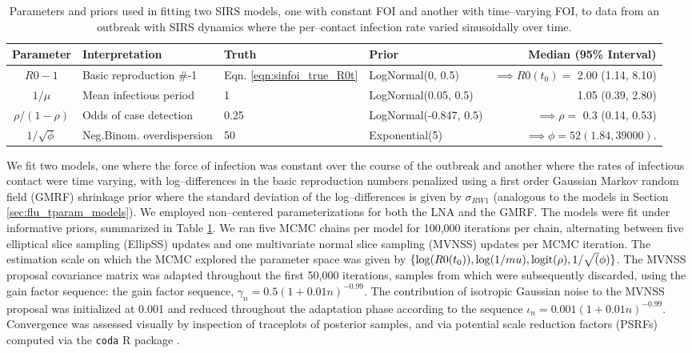 \begin{table}[htbp]
	\caption[Parameters and priors for models fit two SIRS models to data from a simulated outbreak with sinusoidal FOI.]{Parameters and priors used in fitting two SIRS models, one with constant FOI and another with time--varying FOI, to data from an outbreak with SIRS dynamics where the per--contact infection rate varied sinusoidally over time.}
	\label{tab:tparam_sim_priors}
	\scriptsize\centering
	\begin{tabular}{clllr}
		\hline
		\textbf{Parameter} & \textbf{Interpretation} & \textbf{Truth} & \textbf{Prior} & \textbf{Median (95\% Interval)} \\ \hline
		$ R0-1 $ & Basic reproduction \#-1 & Eqn. \ref{eqn:sinfoi_true_R0t} & LogNormal(0, 0.5) & $ \implies R0(t_0) = $ 2.00 (1.14, 8.10) \\ 
		$ 1/\mu $ & Mean infectious period & 1&  LogNormal(0.05, 0.5)& 1.05 (0.39, 2.80) \\
		$ \rho/(1-\rho)  $ & Odds of case detection  &0.25&  LogNormal(-0.847, 0.5) & $ \implies \rho =$ 0.3 (0.14, 0.53) \\
		$ 1/\sqrt{\phi} $ & Neg.Binom. overdispersion & 50 & Exponential(5)& $ \implies \phi = 52 (1.84, 39000) $.  \\
		\hline
	\end{tabular}
\end{table}

We fit two models, one where the force of infection was constant over the course of the outbreak and another where the rates of infectious contact were time varying, with log--differences in the basic reproduction numbers penalized using a first order Gaussian Markov random field (GMRF) shrinkage prior where the standard deviation of the log--differences is given by $ \sigma_{RW1} $ (analogous to the models in Section \ref{sec:flu_tparam_models}). We employed non--centered parameterizations for both the LNA and the GMRF. The models were fit under informative priors, summarized in Table \ref{tab:tparam_sim_priors}. We ran five MCMC chains per model for 100,000 iterations per chain, alternating between five elliptical slice sampling (EllipSS) updates and one multivariate normal slice sampling (MVNSS) updates per MCMC iteration. The estimation scale on which the MCMC explored the parameter space was given by $\lbrace \log(R0(t_0)), \log(1/mu), \mathrm{logit}(\rho), 1/\sqrt(\phi) \rbrace$. The MVNSS proposal covariance matrix was adapted throughout the first 50,000 iterations, samples from which were subsequently discarded, using the gain factor sequence: the gain factor sequence, $\gamma_n = 0.5(1 + 0.01n)^{-0.99}$. The contribution of isotropic Gaussian noise to the MVNSS proposal was initialized at 0.001 and reduced throughout the adaptation phase according to the sequence $ \iota_n = 0.001(1 + 0.01n)^{-0.99} $. Convergence was assessed visually by inspection of traceplots of posterior samples, and via potential scale reduction factors (PSRFs) \cite{brooks1998general} computed via the \texttt{coda} R package \cite{codapackage}.

